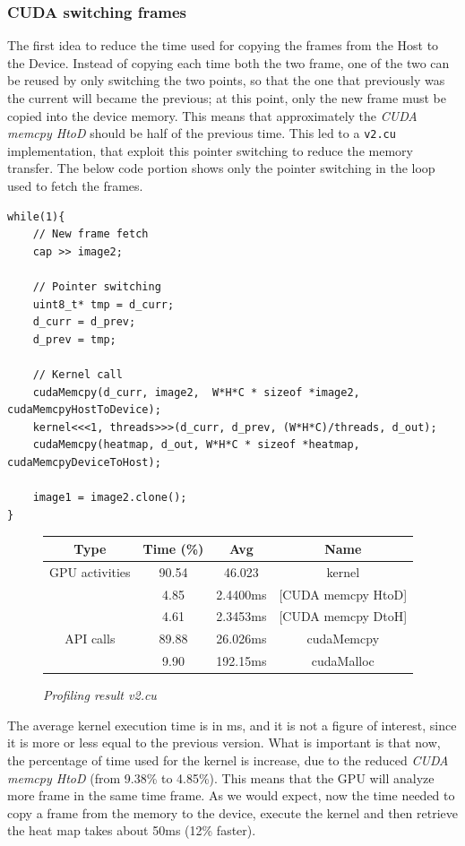 \documentclass[paper=a4, fontsize=10pt]{scrartcl}	%
\begin{document}
	\subsubsection{CUDA switching frames}
	
	The first idea to reduce the time used for copying the frames from the Host to the Device. Instead of copying each time both the two frame, one of the two can be reused by only switching the two points, so that the one that previously was the current will became the previous; at this point, only the new frame must be copied into the device memory. This means that approximately the \textit{CUDA memcpy HtoD} should be half of the previous time. This led to a \texttt{v2.cu} implementation, that exploit this pointer switching to reduce the memory transfer. The below code portion shows only the pointer switching in the loop used to fetch the frames.
		\begin{lstlisting}[style=CStyle]
while(1){
	// New frame fetch
	cap >> image2;
	
	// Pointer switching
	uint8_t* tmp = d_curr;
	d_curr = d_prev;
	d_prev = tmp;
	
	// Kernel call
	cudaMemcpy(d_curr, image2,  W*H*C * sizeof *image2, cudaMemcpyHostToDevice);
	kernel<<<1, threads>>>(d_curr, d_prev, (W*H*C)/threads, d_out);
	cudaMemcpy(heatmap, d_out, W*H*C * sizeof *heatmap, cudaMemcpyDeviceToHost);
	
	image1 = image2.clone();
}\end{lstlisting}
	
	\begin{figure}[H]
		\centering
		\begin{center}
			\begin{tabular}{ |c|c|c|c| } 
				\hline
				\textbf{Type} & \textbf{Time} (\%) & \textbf{Avg} & \textbf{Name} \\ 
				\hline
				GPU activities & 90.54 & 46.023 & kernel \\ 
				& 4.85 & 2.4400ms & [CUDA memcpy HtoD] \\ 
				& 4.61 & 2.3453ms & [CUDA memcpy DtoH] \\ 
				\hline
				API calls & 89.88 & 26.026ms & cudaMemcpy \\ 
				& 9.90 & 192.15ms & cudaMalloc \\ 
				\hline
			\end{tabular}
		\end{center}
		\label{fig:table_v2}
		\caption{\textit{Profiling result v2.cu}}
	\end{figure}
	The average kernel execution time is in ms, and it is not a figure of interest, since it is more or less equal to the previous version. What is important is that now, the percentage of time used for the kernel is increase, due to the reduced \textit{CUDA memcpy HtoD} (from  9.38\% to 4.85\%). This means that the GPU will analyze more frame in the same time frame. As we would expect, now the time needed to copy a frame from the memory to the device, execute the kernel and then retrieve the heat map takes about 50ms (12\% faster).
	
\end{document}
